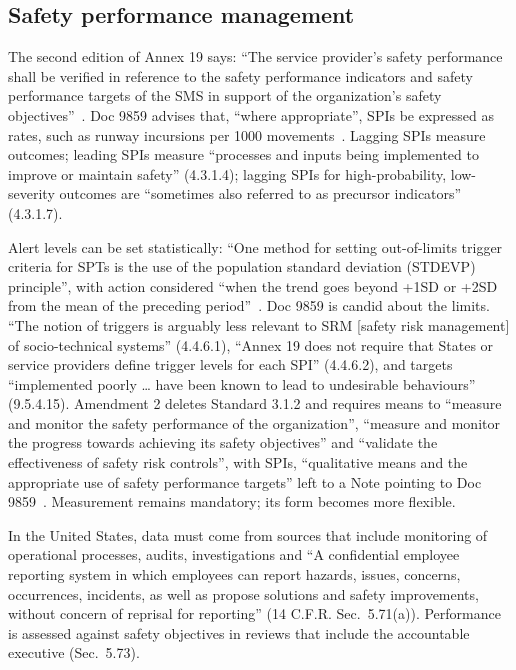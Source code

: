 \documentclass[11pt]{article}
\begin{document}
\subsection{Safety performance management}\label{sec:spm}

The second edition of Annex 19 says: ``The service provider's safety performance shall be verified in reference to the safety performance indicators and safety performance targets of the SMS in support of the organization's safety objectives''~\cite[Appendix~2, 3.1.2]{icao2016annex19}. Doc 9859 advises that, ``where appropriate'', SPIs be expressed as rates, such as runway incursions per \num{1000} movements~\cite[4.3.1.3]{icao2018doc9859}. Lagging SPIs measure outcomes; leading SPIs measure ``processes and inputs being implemented to improve or maintain safety'' (4.3.1.4); lagging SPIs for high-probability, low-severity outcomes are ``sometimes also referred to as precursor indicators'' (4.3.1.7).

Alert levels can be set statistically: ``One method for setting out-of-limits trigger criteria for SPTs is the use of the population standard deviation (STDEVP) principle'', with action considered ``when the trend goes beyond +1SD or +2SD from the mean of the preceding period''~\cite[4.4.5.2]{icao2018doc9859}. Doc 9859 is candid about the limits. ``The notion of triggers is arguably less relevant to SRM {[}safety risk management{]} of socio-technical systems'' (4.4.6.1), ``Annex 19 does not require that States or service providers define trigger levels for each SPI'' (4.4.6.2), and targets ``implemented poorly \ldots{} have been known to lead to undesirable behaviours'' (9.5.4.15). Amendment 2 deletes Standard 3.1.2 and requires means to ``measure and monitor the safety performance of the organization'', ``measure and monitor the progress towards achieving its safety objectives'' and ``validate the effectiveness of safety risk controls'', with SPIs, ``qualitative means and the appropriate use of safety performance targets'' left to a Note pointing to Doc 9859~\cite[attachment]{icao2025amdt2}. Measurement remains mandatory; its form becomes more flexible.

In the United States, data must come from sources that include monitoring of operational processes, audits, investigations and ``A confidential employee reporting system in which employees can report hazards, issues, concerns, occurrences, incidents, as well as propose solutions and safety improvements, without concern of reprisal for reporting'' (14 C.F.R. Sec.~5.71(a)). Performance is assessed against safety objectives in reviews that include the accountable executive (Sec.~5.73).
\end{document}
